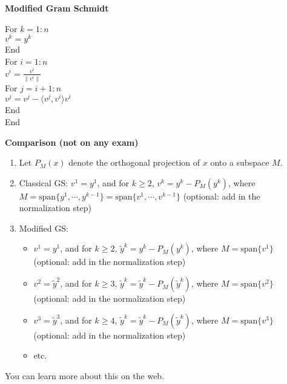 \documentclass[letterpaper]{article}
\newcommand{\spanof}[1]{\textrm{span} \{ #1 \}}
\begin{document}
        \noindent \textbf{Modified Gram Schmidt}

        For $k=1:n$\\
        \indent\hspace{4ex}$v^k=y^k$\\
        End\\
        For $i=1:n$\\
        \indent\hspace{4ex}$v^i=\frac{v^i}{\|v^i\|}$\\
        \indent\hspace{4ex}For $j=i+1:n$\\
        \indent\hspace{8ex}$v^j=v^j-\langle v^j,v^i\rangle v^i$\\
        \indent\hspace{4ex}End\\
        End\\

        \newpage

        \noindent \textbf{Comparison (not on any exam)}

  \begin{enumerate}
\setlength{\itemsep}{.15in}
\renewcommand{\labelenumi}{(\alph{enumi})}
\setlength{\itemsep}{.1in}

\item Let $P_{M}(x) $ denote the orthogonal projection of $x$ onto a subspace $M$.

\item Classical GS: $v^1=y^1$, and for $k\ge 2$, $v^k = y^k-P_M(y^k)$, where $M=\spanof{y^1, \cdots, y^{k-1}}=\spanof{v^1, \cdots, v^{k-1}}$  (optional: add in the normalization step)

\item Modified GS:
\begin{itemize}
\item  $v^1=y^1$, and for $k\ge 2$, $\tilde{y}^k = y^k-P_M(y^k)$, where $M=\spanof{v^1}$  (optional: add in the normalization step)

\item $v^2=\tilde{y}^2$, and for $k\ge 3$, $\tilde{y}^k = \tilde{y}^k-P_M(\tilde{y}^k)$, where $M=\spanof{v^2}$  (optional: add in the normalization step)

    \item $v^3=\tilde{y}^3$, and for $k\ge 4$, $\tilde{y}^k = \tilde{y}^k-P_M(\tilde{y}^k)$, where $M=\spanof{v^3}$  (optional: add in the normalization step)

        \item etc.

        \end{itemize}

\end{enumerate}

You can learn more about this on the web.
\end{document}
